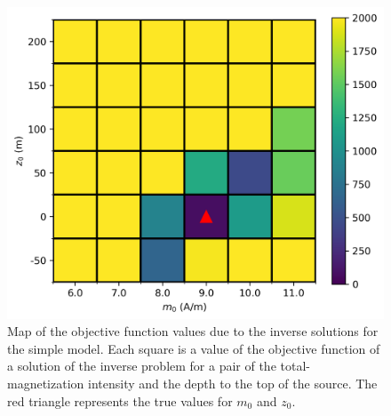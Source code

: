 \begin{figure}
	\centering
	\includegraphics[scale=.75]{figures/wedding_cake_obj_func_map.png}
	\caption{Map of the objective function values due to the inverse solutions for the simple model. Each square is a value of the objective function of a solution of the inverse problem for a pair of the total-magnetization intensity and the depth to the top of the source. The red triangle represents the true values for $m_0$ and $z_0$.
	}
	\label{fig:kimb_map}
\end{figure}

